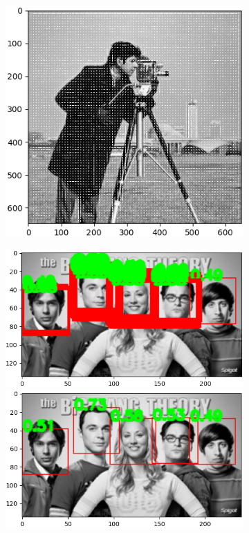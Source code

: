 \documentclass[11pt]{scrartcl}
\begin{document}
\begin{figure}[H]
	\centering
	\begin{subfigure}{0.5\textwidth}
		\centering
		\includegraphics[scale=0.4]{cameraman_HOG.png}
		\caption{}
		\label{fig:cameraman_HOG}
	\end{subfigure}%
	\begin{subfigure}{0.5\textwidth}
		\centering
		\begin{minipage}{1\textwidth}
			\centering
			\includegraphics[scale=1]{face_thresholding.png}
			\caption{}
			\label{fig:face_thresholding}
		\end{minipage}
		\vspace{0.5in}
		\begin{minipage}{1\textwidth}
			\centering
			\includegraphics[scale=1]{face_nms.png}

\end{minipage}
\end{subfigure}
\end{figure}
\end{document}
